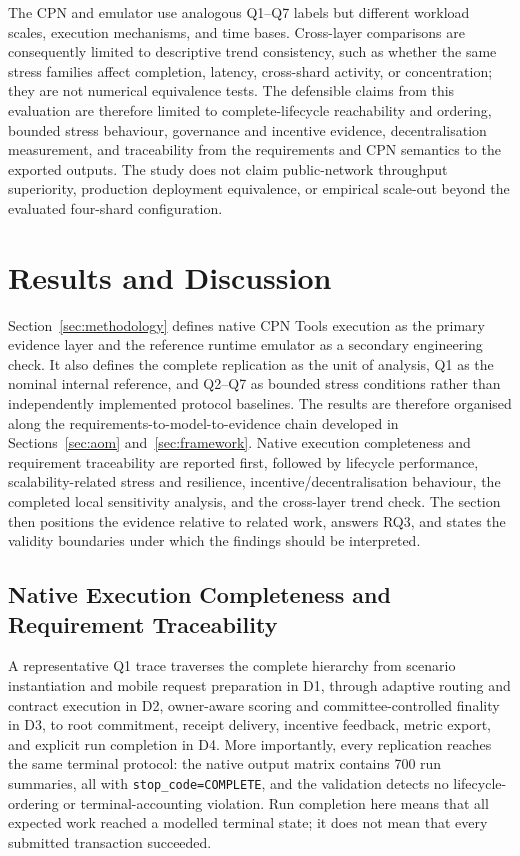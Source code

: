 \documentclass[a4paper,fleqn]{cas-sc}
\begin{document}
The CPN and emulator use analogous Q1--Q7 labels but different workload scales,
execution mechanisms, and time bases. Cross-layer comparisons are consequently
limited to descriptive trend consistency, such as whether the same stress
families affect completion, latency, cross-shard activity, or concentration;
they are not numerical equivalence tests. The defensible claims from this
evaluation are therefore limited to complete-lifecycle reachability and
ordering, bounded stress behaviour, governance and incentive evidence,
decentralisation measurement, and traceability from the requirements and CPN
semantics to the exported outputs. The study does not claim public-network
throughput superiority, production deployment equivalence, or empirical
scale-out beyond the evaluated four-shard configuration.


\section{Results and Discussion}
\label{sec:results}

Section~\ref{sec:methodology} defines native CPN Tools execution as the
primary evidence layer and the reference runtime emulator as a secondary
engineering check. It also defines the complete replication as the unit of
analysis, Q1 as the nominal internal reference, and Q2--Q7 as bounded stress
conditions rather than independently implemented protocol baselines. The
results are therefore organised along the requirements-to-model-to-evidence
chain developed in Sections~\ref{sec:aom} and~\ref{sec:framework}. Native
execution completeness and requirement traceability are reported first,
followed by lifecycle performance, scalability-related stress and resilience,
incentive/decentralisation behaviour, the completed local sensitivity analysis,
and the cross-layer trend check. The
section then positions the evidence relative to related work, answers RQ3, and
states the validity boundaries under which the findings should be interpreted.

\subsection{Native Execution Completeness and Requirement Traceability}
\label{subsec:lifecycle_trace}
\label{subsec:req_satisfaction_results}

A representative Q1 trace traverses the complete hierarchy from scenario
instantiation and mobile request preparation in D1, through adaptive routing and
contract execution in D2, owner-aware scoring and committee-controlled finality
in D3, to root commitment, receipt delivery, incentive feedback, metric export,
and explicit run completion in D4. More importantly, every replication reaches the same terminal protocol: the native output matrix contains 700 run
summaries, all with \texttt{stop\_code=COMPLETE}, and the validation detects no
lifecycle-ordering or terminal-accounting violation. Run completion here means that all
expected work reached a modelled terminal state; it does not mean that every
submitted transaction succeeded.
\end{document}
